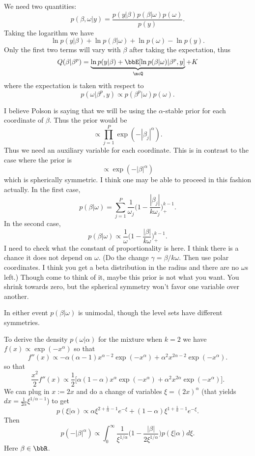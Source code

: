 \documentclass{article}
\begin{document}
We need two quantities:
\[
p(\beta, \omega | y) = \frac{p(y|\beta) p(\beta | \omega) p(\omega)}{p(y)}.
\]
Taking the logarithm we have
\[
\ln p(y | \beta) + \ln p(\beta | \omega) + \ln p(\omega) - \ln p(y).
\]
Only the first two terms will vary with $\beta$ after taking the expectation, thus
\[
Q(\beta | \beta^p) = \underbrace{\ln p(y | \beta) + \bbE[\ln p(\beta | \omega) |
  \beta^p, y]}_{\mcQ} + K
\]
where the expectation is taken with respect to
\[
p(\omega | \beta^p, y) \propto p(\beta^p | \omega) p(\omega).
\]

I believe Polson is saying that we will be using the $\alpha$-stable prior for
each coordinate of $\beta$.  Thus the prior would be
\[
\propto \prod_{j=1}^P \exp(-|\beta_j|^\alpha).
\]
Thus we need an auxiliary variable for each coordinate.  This is in contrast to
the case where the prior is
\[
\propto \exp (-|\beta|^\alpha)
\]
which is spherically symmetric.  I think one may be able to proceed in this
fashion actually.  In the first case,
\[
p(\beta | \omega) = \sum_{j=1}^P \frac{1}{\omega_j} \Big(1 -
\frac{|\beta_j|}{k\omega_j}\Big)^{k-1}_+.
\]
In the second case,
\[
p(\beta | \omega) \propto \frac{1}{\omega} \Big(1 -
\frac{|\beta|}{k\omega}\Big)_+^{k-1}.
\]
I need to check what the constant of proportionality is here.  I think there is
a chance it does not depend on $\omega$.  (Do the change $\gamma = \beta /
k\omega$.  Then use polar coordinates.  I think you get a beta distribution in
the radius and there are no $\omega$s left.)  Though come to think of it, maybe
this prior is not what you want.  You shrink towards zero, but the spherical
symmetry won't favor one variable over another.

In either event $p(\beta | \omega)$ is unimodal, though the level sets have
different symmetries.

To derive the density $p(\omega | \alpha)$ for the mixture when $k=2$ we have
$f(x) \propto \exp(-x^\alpha)$ so that
\[
f''(x) 
\propto - \alpha (\alpha - 1) x^{\alpha - 2} \exp({-x^\alpha}) + \alpha^2
x^{2\alpha - 2} \exp(-x^\alpha).
\]
so that
\[
\frac{x^2}{2} f''(x) \propto \frac{1}{2} \Big[ \alpha (1 - \alpha) x^{\alpha}
\exp({-x^\alpha}) + \alpha^2 x^{2\alpha} \exp(-x^\alpha) \Big].
\]
We can plug in $x := 2x$ and do a change of variables $\xi = (2x)^\alpha$
(that yields $dx = \frac{1}{2 \alpha} \xi^{1/\alpha - 1}$) to get
\[
p(\xi | \alpha) \propto \alpha \xi^{2 + \frac{1}{\alpha} - 1} e^{-\xi} + 
(1-\alpha) \xi^{1 + \frac{1}{\alpha} - 1} e^{-\xi}.
\]
Then
\[
p(-|\beta|^\alpha) \propto \int_0^\infty \frac{1}{\xi^{1/\alpha}} \Big( 1 -
\frac{|\beta|}{2 \xi^{1/\alpha}} \Big) p(\xi | \alpha) d\xi.
\]
Here $\beta \in \bbR$.
\end{document}

